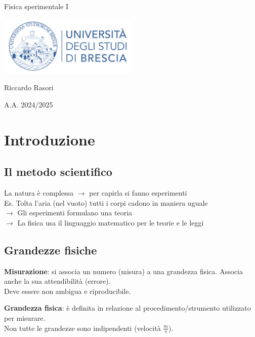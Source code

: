 \documentclass{report}
\begin{document}
\begin{center}
  \vspace*{2cm}
  {\Huge Fisica sperimentale I \par}
  \vspace{1cm}
  \includegraphics[width=0.5\textwidth]{logounibs.png}\par
  \vspace{1cm}
  {\Large Riccardo Rasori \par}
  \vspace{0.5cm}
  {\large A.A. 2024/2025 \par}
  \vspace{2cm}
\end{center}

\tableofcontents %

\chapter{Introduzione}

\section{Il metodo scientifico}
La natura è complessa $\rightarrow$ per capirla si fanno esperimenti\\
Es. Tolta l'aria (nel vuoto) tutti i corpi cadono in maniera uguale
\\
$\rightarrow$ Gli esperimenti formulano una teoria\\
$\rightarrow$ La fisica usa il linguaggio matematico per le teorie e le leggi\\
\section{Grandezze fisiche}
\begin{definition}
  \textbf{Misurazione}: si associa un numero (misura) a una grandezza fisica. Associa anche la sua attendibilità (errore).\\
  Deve essere non ambigua e riproducibile.
\end{definition}
\begin{definition}
  \textbf{Grandezza fisica}: è definita in relazione al procedimento/strumento utilizzato per misurare.\\
  Non tutte le grandezze sono indipendenti (velocità $\frac{m}{s}$).
\end{definition}
\end{document}
